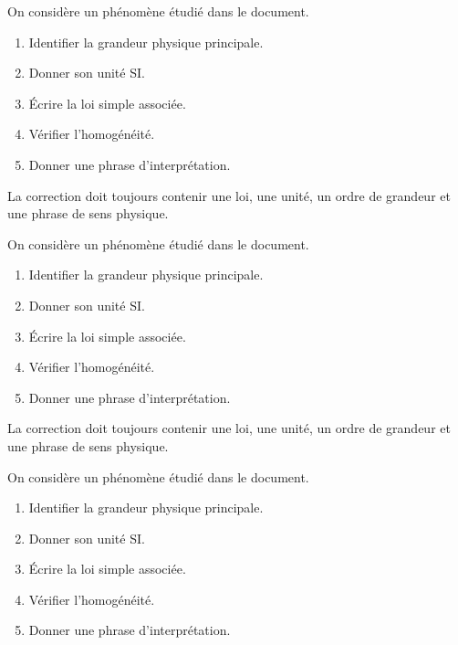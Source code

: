 \documentclass[11pt,a4paper]{article}
\begin{document}
\begin{exercicebox}
On considère un phénomène étudié dans le document. 
\begin{enumerate}
  \item Identifier la grandeur physique principale.
  \item Donner son unité SI.
  \item Écrire la loi simple associée.
  \item Vérifier l'homogénéité.
  \item Donner une phrase d'interprétation.
\end{enumerate}
\end{exercicebox}

\begin{corrigebox}[Indication 3]
La correction doit toujours contenir une loi, une unité, un ordre de grandeur et une phrase de sens physique.
\end{corrigebox}

\begin{exercicebox}
On considère un phénomène étudié dans le document. 
\begin{enumerate}
  \item Identifier la grandeur physique principale.
  \item Donner son unité SI.
  \item Écrire la loi simple associée.
  \item Vérifier l'homogénéité.
  \item Donner une phrase d'interprétation.
\end{enumerate}
\end{exercicebox}

\begin{corrigebox}[Indication 4]
La correction doit toujours contenir une loi, une unité, un ordre de grandeur et une phrase de sens physique.
\end{corrigebox}

\begin{exercicebox}
On considère un phénomène étudié dans le document. 
\begin{enumerate}
  \item Identifier la grandeur physique principale.
  \item Donner son unité SI.
  \item Écrire la loi simple associée.
  \item Vérifier l'homogénéité.
  \item Donner une phrase d'interprétation.
\end{enumerate}
\end{exercicebox}
\end{document}
